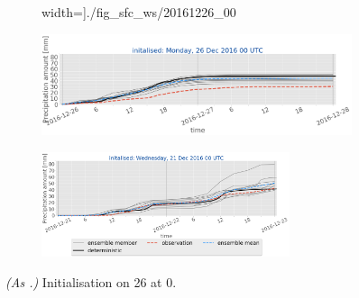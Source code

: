 \begin{figure}[H]
\begin{subfigure}[b]{0.93\textwidth}
		width=\textwidth]{./fig_sfc_ws/20161226_00}
		\caption{}\label{fig:res:sfc_ws26}
	\end{subfigure}
	\begin{subfigure}[b]{0.93\textwidth}
		\includegraphics[trim={0.cm 1.5cm 0cm 0cm},clip,
		width=\textwidth]{./fig_sfc_precip/20161226_00}
		\caption{}\label{fig:res:sfc_precip26}
	\end{subfigure}
	\begin{subfigure}[b]{\textwidth}
		\centering
		\includegraphics[trim={5.5cm 0cm 5.cm 17.7cm},clip,
		width=0.8\textwidth]{./fig_sfc_precip/20161221_00_label}
	\end{subfigure}
	\caption{\textit{(As .)} Initialisation on \SI{26}{\dec} at \SI{0}{\UTC}.}\label{fig:obs_meps:26}
\end{figure}
%
